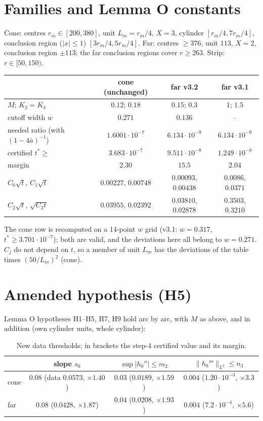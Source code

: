 \documentclass[10pt]{article}
\begin{document}
\section{Families and Lemma O constants}
Cone: centres $r_m\in[200,380]$, unit $L_m=r_m/4$, $X=3$, cylinder $[r_m/4,7r_m/4]$, conclusion region ($|x|\le1$) $[3r_m/4,5r_m/4]$. Far: centres $\ge376$, unit $113$, $X=2$, conclusion region $\pm113$; the far conclusion regions cover $r\ge263$. Strip: $r\in[50,150)$.
\begin{center}\small\begin{tabular}{lccc}\toprule
 & cone (unchanged) & far v3.2 & far v3.1\\\midrule
$M$; $K_2=K_3$ & $0.12$; $0.18$ & $0.15$; $0.3$ & $1$; $1.5$\\
cutoff width $w$ & $0.271$ & $0.136$ & --\\
needed ratio (with $(1-4\bar a)^{-1}$) & $1.6001\cdot10^{-7}$ & $6.134\cdot10^{-9}$ & $6.134\cdot10^{-9}$\\
certified $t^*\ge$ & $3.683\cdot10^{-7}$ & $9.511\cdot10^{-8}$ & $1.249\cdot10^{-8}$\\
margin & $2.30$ & $15.5$ & $2.04$\\
$C_0\sqrt t$, $C_1\sqrt t$ & $0.00227$, $0.00748$ & $0.00093$, $0.00438$ & $0.0086$, $0.0371$\\
$C_2\sqrt t$, $\sqrt{C_3t}$ & $0.03955$, $0.02392$ & $0.03810$, $0.02878$ & $0.3503$, $0.3210$\\\bottomrule
\end{tabular}\end{center}
The cone row is recomputed on a 14-point $w$ grid (v3.1: $w=0.317$, $t^*\ge3.701\cdot10^{-7}$); both are valid, and the deviations here all belong to $w=0.271$. $C_j$ do not depend on $t$, so a member of unit $L_m$ has the deviations of the table times $(50/L_m)^2$ (cone).

\section{Amended hypothesis (H5)}
Lemma O hypotheses H1--H5, H7, H9 hold arc by arc, with $M$ as above, and in addition (own cylinder units, whole cylinder):
\begin{table}[h]\centering\small
\begin{tabular}{lccc}\toprule
 & slope $s_0$ & $\sup|h_0''|\le m_2$ & $\|h_0'''\|_{L^2}\le n_3$\\\midrule
cone & $0.08$ (data $0.0573$, $\times1.40$) & $0.03$ ($0.0189$, $\times1.59$) & $0.004$ ($1.20\cdot10^{-3}$, $\times3.3$)\\
far & $0.08$ ($0.0428$, $\times1.87$) & $0.04$ ($0.0208$, $\times1.93$) & $0.004$ ($7.2\cdot10^{-4}$, $\times5.6$)\\\bottomrule
\end{tabular}\caption{New data thresholds; in brackets the step-4 certified value and its margin.}\label{tab:thr}\end{table}
\end{document}
